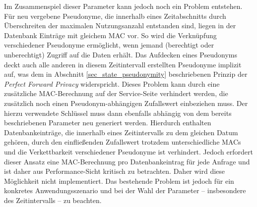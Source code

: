 Im Zusammenspiel dieser Parameter kann jedoch noch ein Problem entstehen. Für neu vergebene Pseudonyme, die innerhalb eines Zeitabschnitts durch Überschreiten der maximalen Nutzungsanzahl entstanden sind, liegen in der Datenbank Einträge mit gleichem MAC vor. So wird die Verknüpfung verschiedener Pseudonyme ermöglicht, wenn jemand (berechtigt oder unberechtigt) Zugriff auf die Daten erhält. Das Aufdecken eines Pseudonyms deckt auch alle anderen in diesem Zeitintervall erstellten Pseudonyme implizit auf, was dem in Abschnitt \ref{sec_state_pseudonymity} beschriebenen Prinzip der \textit{Perfect Forward Privacy} widerspricht. 
Dieses Problem kann durch eine zusätzliche MAC-Berechnung auf der Service-Seite verhindert werden, die zusätzlich noch einen Pseudonym-abhängigen Zufallswert einbeziehen muss. Der hierzu verwendete Schlüssel muss dann ebenfalls abhängig von dem bereits beschriebenen Parameter neu generiert werden. Hierdurch enthalten Datenbankeinträge, die innerhalb eines Zeitintervalls zu dem gleichen Datum gehören, durch den einfließenden Zufallswert trotzdem unterschiedliche MACs und die Verkettbarkeit verschiedener Pseudonyme ist verhindert. Jedoch erfordert dieser Ansatz eine MAC-Berechnung pro Datenbankeintrag für jede Anfrage und ist daher aus Performance-Sicht kritisch zu betrachten. Daher wird diese Möglichkeit nicht implementiert. Das bestehende Problem ist jedoch für ein konkretes Anwendungsszenario und bei der Wahl der Parameter -- insbesondere des Zeitintervalls -- zu beachten.
